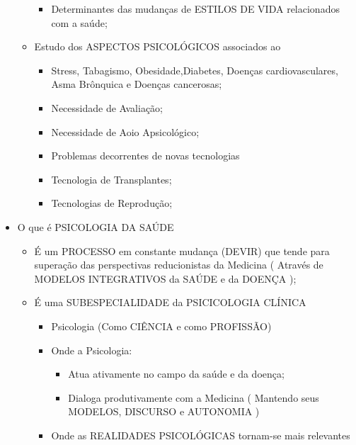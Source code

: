 \documentclass[
]{book}
\providecommand{\tightlist}{%
  \setlength{\itemsep}{0pt}\setlength{\parskip}{0pt}}
\begin{document}
\begin{itemize}
\begin{itemize}
    \begin{itemize}
    \tightlist
    \item
      Determinantes das mudanças de ESTILOS DE VIDA relacionados com a saúde;
    \end{itemize}
  \item
    Estudo dos ASPECTOS PSICOLÓGICOS associados ao

    \begin{itemize}
    \tightlist
    \item
      Stress, Tabagismo, Obesidade,Diabetes, Doenças cardiovasculares, Asma Brônquica e Doenças cancerosas;
    \item
      Necessidade de Avaliação;
    \item
      Necessidade de Aoio Apsicológico;
    \item
      Problemas decorrentes de novas tecnologias
    \item
      Tecnologia de Transplantes;
    \item
      Tecnologias de Reprodução;
    \end{itemize}
  \end{itemize}
\item
  O que é PSICOLOGIA DA SAÚDE

  \begin{itemize}
  \tightlist
  \item
    É um PROCESSO em constante mudança (DEVIR) que tende para superação das perspectivas reducionistas da Medicina ( Através de MODELOS INTEGRATIVOS da SAÚDE e da DOENÇA );
  \item
    É uma SUBESPECIALIDADE da PSICICOLOGIA CLÍNICA

    \begin{itemize}
    \tightlist
    \item
      Psicologia (Como CIÊNCIA e como PROFISSÃO)
    \item
      Onde a Psicologia:

      \begin{itemize}
      \tightlist
      \item
        Atua ativamente no campo da saúde e da doença;
      \item
        Dialoga produtivamente com a Medicina ( Mantendo seus MODELOS, DISCURSO e AUTONOMIA )
      \end{itemize}
    \item
      Onde as REALIDADES PSICOLÓGICAS tornam-se mais relevantes


\end{itemize}
\end{itemize}
\end{itemize}
\end{document}
